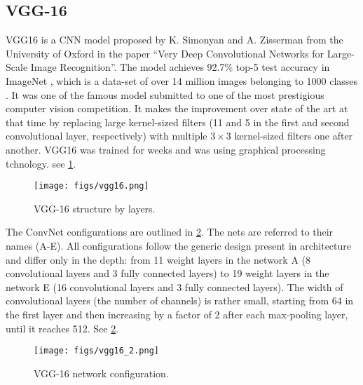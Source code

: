 \subsection{VGG-16}

VGG16 is a CNN model proposed by K. Simonyan and A. Zisserman from the University of Oxford in the paper “Very Deep Convolutional Networks for Large-Scale Image Recognition”. The model achieves 92.7\% top-5 test accuracy in ImageNet \cite{b10}, which is a data-set of over 14 million images belonging to 1000 classes \cite{b21}. It was one of the famous model submitted to one of the most prestigious computer vision competition. It makes the improvement over state of the art at that time by replacing large kernel-sized filters (11 and 5 in the first and second convolutional layer, respectively) with multiple $3 \times 3$ kernel-sized filters one after another. VGG16 was trained for weeks and was using graphical processing tchnology. see \cref{fig:vgg16}.

\begin{figure}[!htpb]
	\centering
	\texttt{[image: figs/vgg16.png]}
	\caption{VGG-16 structure by layers.}\label{fig:vgg16}
\end{figure}

The ConvNet configurations are outlined in \cref{fig:vgg16_2}. The nets are referred to their names (A-E). All configurations follow the generic design present in architecture and differ only in the depth: from 11 weight layers in the network A (8 convolutional layers  and 3 fully connected layers) to 19 weight layers in the network E (16 convolutional layers  and 3 fully connected  layers). The width of convolutional  layers (the number of channels) is rather small, starting from 64 in the first layer and then increasing by a factor of 2 after each max-pooling layer, until it reaches 512. See \cref{fig:vgg16_2}.

\begin{figure}[!htpb]
	\centering
	\texttt{[image: figs/vgg16\_2.png]}
	\caption{VGG-16 network configuration.}\label{fig:vgg16_2}
\end{figure}

